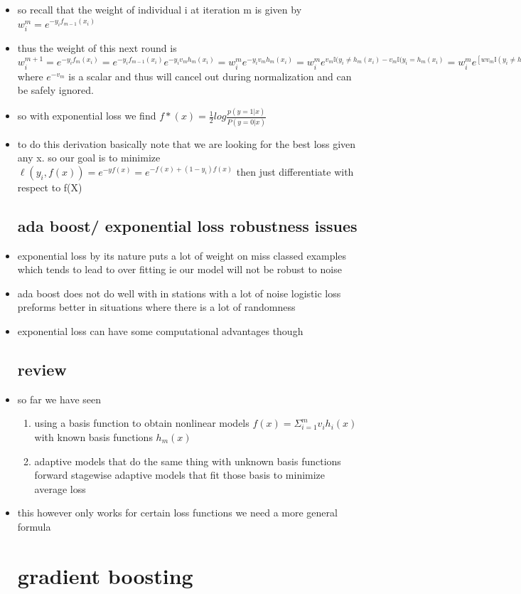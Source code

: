 \documentclass{article}
\begin{document}
\begin{itemize}
\item so recall that the weight of individual i at iteration m is given by $w_{i}^{m}=e^{-y_if_{m-1}(x_i)}$
\item thus the weight of this next  round is $w_{i}^{m+1}=e^{-y_if_{m}(x_i)}=e^{-y_if_{m-1}(x_i)}e^{-y_iv_mh_m(x_i)}=w_{i}^{m}e^{-y_iv_mh_m(x_i)}=w_{i}^{m}e^{v_m\mathbb{I}(y_i\neq h_m(x_i)-v_m\mathbb{I}(y_i= h_m(x_i)}=w_i^{m}e^[wv_m\mathbb{I}(y_i\neq h_{m}(X_i))]e^{-v_m}$ where $e^{-v_m}$ is a scalar and thus will cancel out during normalization and can be safely ignored. 
\item so with exponential loss we find $f*(x)=\frac{1}{2}log\frac{p(y=1|x)}{P(y=0|x)}$ 
\item to do this derivation basically note that we are looking for the best loss given any x. so our goal is to minimize $\ell(y_i,f(x))=e^{-yf(x)}=e^{-f(x)+(1-y_i)f(x)}$ then just differentiate with respect to f(X)
\subsection{ada boost/ exponential loss robustness issues}
\item exponential loss by its nature puts  a lot of weight on miss classed examples which tends to lead to over fitting ie our model will not be robust to noise
\item ada boost does not do well with in stations with a lot of noise
\itme logistic loss preforms better in situations where there is a lot of randomness
\item exponential loss can have some computational advantages though 
\subsection{review}
\item so far we have seen 
\begin{enumerate}
    \item using a basis function to obtain nonlinear models $f(x)=\Sigma_{i=1}^{m}v_ih_i(x)$ with known basis functions $h_m(x)$
    \item adaptive models that do the same thing with unknown basis functions 
    \itme forward stagewise adaptive models that fit those basis to minimize average loss
\end{enumerate}
\item this however only works for certain loss functions we need a more general formula
\section{gradient boosting}

\end{itemize}
\end{document}
